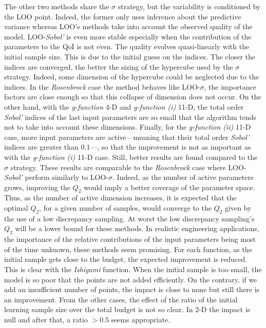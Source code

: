 The other two methods share the $\sigma$ strategy, but the variability is conditioned by the LOO point. Indeed, the former only uses inference about the predictive variance whereas LOO's methods take into account the observed quality of the model.
LOO-\textit{Sobol'} is even more stable especially when the contribution of the parameters to the QoI is not even. The quality evolves quasi-linearly with the initial sample size. This is due to the initial guess on the indices. The closer the indices are converged, the better the sizing of the hypercube used by the $\sigma$ strategy. Indeed, some dimension of the hypercube could be neglected due to the indices. In the \textit{Rosenbrock} case the method behaves like LOO-$\sigma$, the importance factors are close enough so that this collapse of dimension does not occur. On the other hand, with the \textit{g-function} 4-D and \textit{g-function (i)} 11-D, the total order \textit{Sobol'} indices of the last input parameters are so small that the algorithm tends not to take into account these dimensions. Finally, for the \textit{g-function (ii)} 11-D case, more input parameters are active---meaning that their total order \textit{Sobol'} indices are greater than 0.1---, so that the improvement is not as important as with the \textit{g-function (i)} 11-D case. Still, better results are found compared to the $\sigma$ strategy. These results are comparable to the \textit{Rosenbrock} case where LOO-\textit{Sobol'} perform similarly to LOO-$\sigma$. Indeed, as the number of active parameters grows, improving the $Q_2$ would imply a better coverage of the parameter space. Thus, as the number of active dimension increases, it is expected that the optimal $Q_2$, for a given number of samples, would converge to the $Q_2$ given by the use of a low discrepancy sampling. At worst the low discrepancy sampling's $Q_2$ will be a lower bound for these methods. In realistic engineering applications, the importance of the relative contributions of the input parameters being most of the time unknown, these methods seem promising.
For each function, as the initial sample gets close to the budget, the expected improvement is reduced. This is clear with the \textit{Ishigami} function. When the initial sample is too small, the model is so poor that the points are not added efficiently. On the contrary, if we add an insufficient number of points, the impact is close to none but still there is an improvement. From the other cases, the effect of the ratio of the initial learning sample size over the total budget is not so clear. In 2-D the impact is null and after that, a ratio $>0.5$ seems appropriate.

